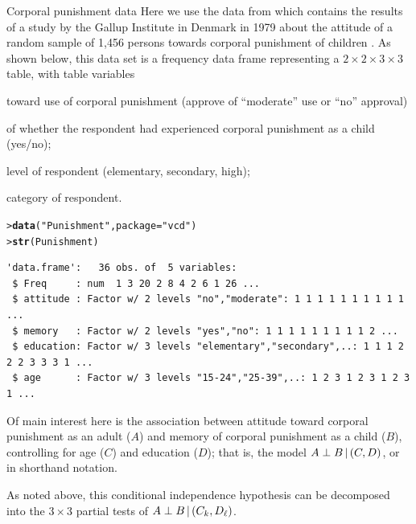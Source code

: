 \documentclass[10pt,krantz2]{krantz}\usepackage[]{graphicx}\usepackage[]{color}
\makeatletter
\newcommand{\hlstr}[1]{\textcolor[rgb]{0.192,0.494,0.8}{#1}}%
\newcommand{\hlstd}[1]{\textcolor[rgb]{0.345,0.345,0.345}{#1}}%
\newcommand{\hlkwc}[1]{\textcolor[rgb]{0.333,0.667,0.333}{#1}}%
\newcommand{\hlkwd}[1]{\textcolor[rgb]{0.737,0.353,0.396}{\textbf{#1}}}%
\newenvironment{kframe}{%
 \def\at@end@of@kframe{}%
 \ifinner\ifhmode%
  \def\at@end@of@kframe{\end{minipage}}%
  \begin{minipage}{\columnwidth}%
 \fi\fi%
 \def\FrameCommand##1{\hskip\@totalleftmargin \hskip-\fboxsep
 \colorbox{shadecolor}{##1}\hskip-\fboxsep
     \hskip-\linewidth \hskip-\@totalleftmargin \hskip\columnwidth}%
 \MakeFramed {\advance\hsize-\width
   \@totalleftmargin\z@ \linewidth\hsize
   \@setminipage}}%
 {\par\unskip\endMakeFramed%
 \at@end@of@kframe}
\newenvironment{knitrout}{}{} %
\renewenvironment{knitrout}{\small\renewcommand{\baselinestretch}{.85}}{} %
\makeatother
\begin{document}
\begin{Example}[punish]{Corporal punishment data}
Here we use the  data from 
which contains the results of
a study by the Gallup Institute in Denmark in 1979 about the attitude of a random sample of 1,456 persons towards corporal punishment of children \citep[pp. 207-208]{Andersen:91}.
As shown below, this data set is a frequency data frame representing a
$2 \times 2 \times 3 \times 3$ table, with table variables
\begin{seriate}
 \item {} toward use of corporal punishment (approve of ``moderate'' use or ``no'' approval)
 \item {} of whether the respondent had experienced corporal punishment as a child (yes/no);
 \item {} level of respondent (elementary, secondary, high);
 \item {} category of respondent.
\end{seriate}
\begin{knitrout}\footnotesize
{}\color{fgcolor}\begin{kframe}
\begin{alltt}
\hlstd{> }\hlkwd{data}\hlstd{(}\hlstr{"Punishment"}\hlstd{,} \hlkwc{package} \hlstd{=} \hlstr{"vcd"}\hlstd{)}
\hlstd{> }\hlkwd{str}\hlstd{(Punishment)}
\end{alltt}
\begin{verbatim}
'data.frame':	36 obs. of  5 variables:
 $ Freq     : num  1 3 20 2 8 4 2 6 1 26 ...
 $ attitude : Factor w/ 2 levels "no","moderate": 1 1 1 1 1 1 1 1 1 1 ...
 $ memory   : Factor w/ 2 levels "yes","no": 1 1 1 1 1 1 1 1 1 2 ...
 $ education: Factor w/ 3 levels "elementary","secondary",..: 1 1 1 2 2 2 3 3 3 1 ...
 $ age      : Factor w/ 3 levels "15-24","25-39",..: 1 2 3 1 2 3 1 2 3 1 ...
\end{verbatim}
\end{kframe}
\end{knitrout}
Of main interest here is the association between attitude toward corporal punishment as an adult ($A$)
and memory of corporal punishment as a child ($B$),
controlling for age ($C$) and education ($D$); that is, the model $A \perp B \, | \, (C,D)$,
or  in shorthand notation.

As noted above, this conditional independence
hypothesis can be decomposed into the $3 \times 3$ partial tests of
$A \perp B \, | \, (C_k,D_\ell)$.


\end{Example}
\end{document}
